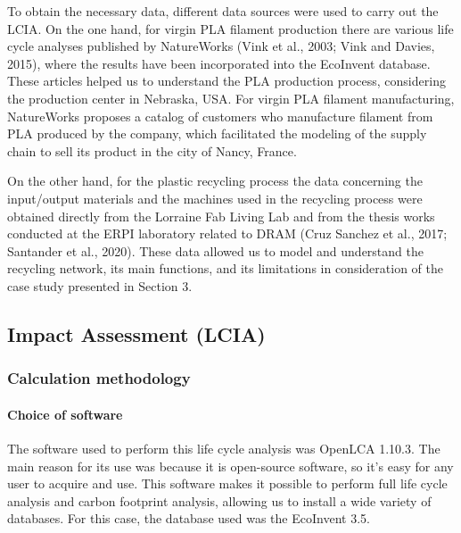 \documentclass[]{elsarticle} %
\begin{document}
To obtain the necessary data, different data sources were used to carry out the LCIA.
On the one hand, for virgin PLA filament production there are various life cycle analyses published by NatureWorks (Vink et al., 2003; Vink and Davies, 2015), where the results have been incorporated into the EcoInvent database.
These articles helped us to understand the PLA production process, considering the production center in Nebraska, USA.
For virgin PLA filament manufacturing, NatureWorks proposes a catalog of customers who manufacture filament from PLA produced by the company, which facilitated the modeling of the supply chain to sell its product in the city of Nancy, France.

On the other hand, for the plastic recycling process the data concerning the input/output materials and the machines used in the recycling process were obtained directly from the Lorraine Fab Living Lab and from the thesis works conducted at the ERPI laboratory related to DRAM (Cruz Sanchez et al., 2017; Santander et al., 2020). These data allowed us to model and understand the recycling network, its main functions, and its limitations in consideration of the case study presented in Section 3.

\hypertarget{impact-assessment-lcia}{%
\subsection{Impact Assessment (LCIA)}\label{impact-assessment-lcia}}

\hypertarget{calculation-methodology}{%
\subsubsection{Calculation methodology}\label{calculation-methodology}}

\hypertarget{choice-of-software}{%
\paragraph{Choice of software}\label{choice-of-software}}

The software used to perform this life cycle analysis was OpenLCA 1.10.3. The main reason for its use was because it is open-source software, so it's easy for any user to acquire and use. This software makes it possible to perform full life cycle analysis and carbon footprint analysis, allowing us to install a wide variety of databases. For this case, the database used was the EcoInvent 3.5.
\end{document}
